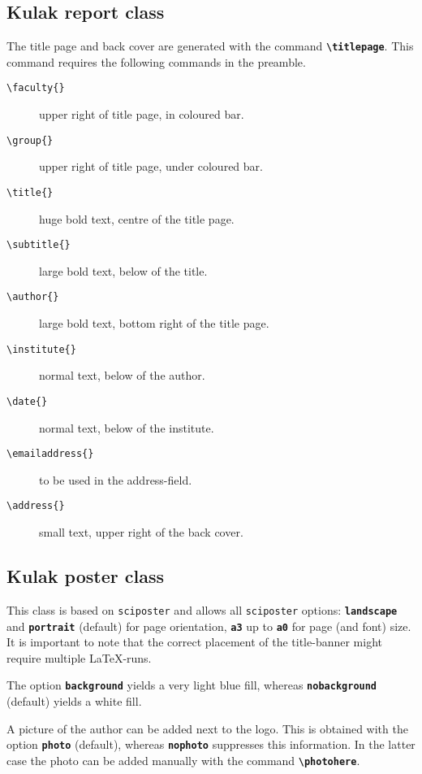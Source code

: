 \documentclass[kulak]{kulakarticle} %
\begin{document}
\subsection{Kulak report class}

The title page and back cover are generated with the command \textbf{\texttt{\textbackslash titlepage}}. This command requires the following commands in the preamble.

\begin{description}
\item[\texttt{\textbackslash faculty\{\}}]      upper right of title page, in coloured bar.
\item[\texttt{\textbackslash group\{\}}]        upper right of title page, under coloured bar.
\item[\texttt{\textbackslash title\{\}}]        huge bold text, centre of the title page.
\item[\texttt{\textbackslash subtitle\{\}}]     large bold text, below of the title.
\item[\texttt{\textbackslash author\{\}}]       large bold text, bottom right of the title page.
\item[\texttt{\textbackslash institute\{\}}]    normal text, below of the author.
\item[\texttt{\textbackslash date\{\}}]         normal text, below of the institute.
\item[\texttt{\textbackslash emailaddress\{\}}] to be used in the address-field.
\item[\texttt{\textbackslash address\{\}}]      small text, upper right of the back cover.
\end{description}

\subsection{Kulak poster class}

This class is based on \texttt{sciposter} and allows all \texttt{sciposter} options: \textbf{\texttt{landscape}} and \textbf{\texttt{portrait}} (default) for page orientation, \textbf{\texttt{a3}} up to \textbf{\texttt{a0}} for page (and font) size. It is important to note that the correct placement of the title-banner might require multiple \LaTeX-runs.

The option \textbf{\texttt{background}} yields a very light blue fill, whereas \textbf{\texttt{nobackground}} (default) yields a white fill.

A picture of the author can be added next to the logo. This is obtained with the option \textbf{\texttt{photo}} (default), whereas \textbf{\texttt{nophoto}} suppresses this information. In the latter case the photo can be added manually with the command \textbf{\texttt{\textbackslash photohere}}.
\end{document}
